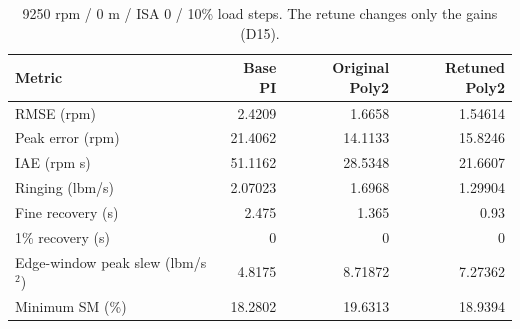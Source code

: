 \begin{table}[htbp]\centering\small\setlength{\tabcolsep}{4pt}\begin{tabular}{@{}lrrr@{}}\toprule
Metric & Base PI & Original Poly2 & Retuned Poly2\\\midrule
RMSE (rpm) & 2.4209 & 1.6658 & 1.54614\\
Peak error (rpm) & 21.4062 & 14.1133 & 15.8246\\
IAE (rpm s) & 51.1162 & 28.5348 & 21.6607\\
Ringing (lbm/s) & 2.07023 & 1.6968 & 1.29904\\
Fine recovery (s) & 2.475 & 1.365 & 0.93\\
1\% recovery (s) & 0 & 0 & 0\\
Edge-window peak slew (lbm/s$^2$) & 4.8175 & 8.71872 & 7.27362\\
Minimum SM (\%) & 18.2802 & 19.6313 & 18.9394\\
\bottomrule\end{tabular}\caption{9250 rpm / 0 m / ISA 0 / 10\% load steps. The retune changes only the gains (D15).}\label{tab:tune}\end{table}